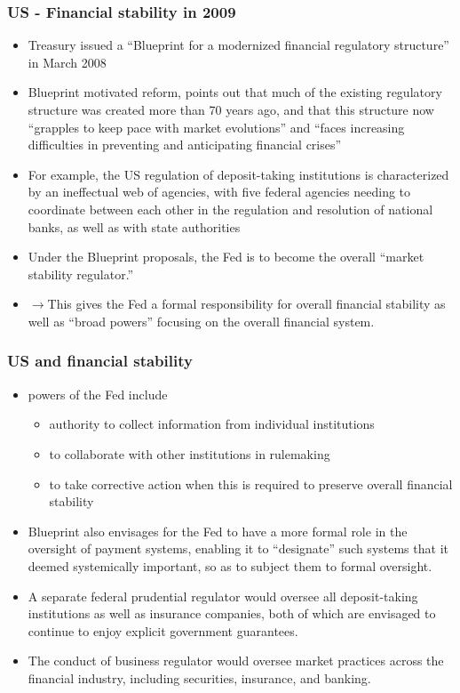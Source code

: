 \documentclass[11pt]{beamer}
\begin{document}
\begin{frame}
\frametitle{US - Financial stability in 2009}
\begin{itemize}
\item  Treasury issued a “Blueprint for a modernized financial regulatory structure” in March 2008
\item Blueprint motivated reform, points out that much of the existing regulatory structure was created more than 70 years ago, and that this structure now “grapples to keep pace with market evolutions” and “faces increasing difficulties in preventing and anticipating financial crises”
\item For example, the US regulation of deposit-taking institutions is characterized by an ineffectual web of agencies, with five federal agencies needing to coordinate between each other in the regulation and resolution of national banks, as well as with state authorities
\item Under the Blueprint proposals, the Fed is to become the overall “market stability regulator.”
\item $\rightarrow$This gives the Fed a formal responsibility for overall financial stability as well as “broad powers” focusing on the overall financial system.

\end{itemize}
\end{frame}

\begin{frame}
\frametitle{US and financial stability}
\begin{itemize}
\item powers of the Fed include
\begin{itemize}
\item authority to collect information from individual institutions
\item to collaborate with other institutions in rulemaking
\item to take corrective action when this is required to preserve overall financial stability
\end{itemize}
\item Blueprint also envisages for the Fed to have a more formal role in the oversight of payment systems, enabling it to “designate” such systems that it deemed systemically important, so as to subject them to formal oversight.
\item A separate federal prudential regulator would oversee all
deposit-taking institutions as well as insurance companies, both of which are envisaged to continue to enjoy explicit government guarantees.
\item The conduct of business regulator would oversee market practices across the financial industry, including securities, insurance, and banking.
\end{itemize}
\end{frame}
\end{document}
